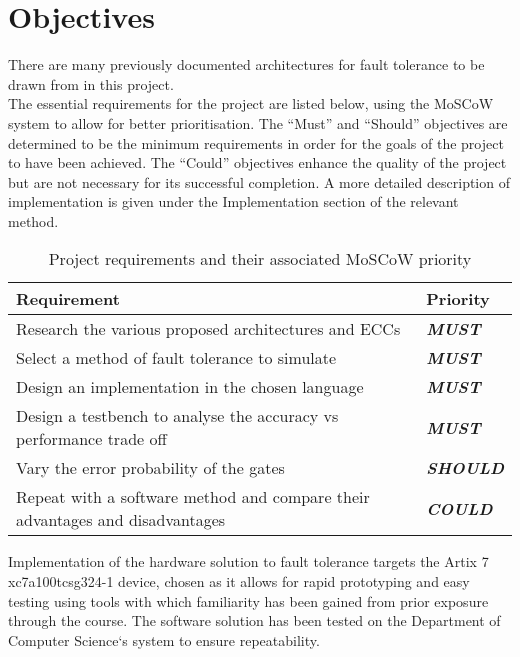 \section{Objectives}
\label{sec:objs}

\noindent There are many previously documented architectures for fault tolerance to be drawn from in this project. \\

\noindent The essential requirements for the project are listed below, using the MoSCoW system to allow for better prioritisation. The 
``Must'' and ``Should'' objectives are determined to be the minimum requirements in order for the goals of the project to have been 
achieved. The “Could” objectives enhance the quality of the project but are not necessary for its successful completion. A more detailed 
description of implementation is given under the Implementation section of the relevant method.

\begin{table}[H] 
\begin{tabular}{| M{0.47\textwidth} | M{0.47\textwidth} |}
    \hline
    Requirement & Priority  \\ \hline
    Research the various proposed architectures and ECCs & \textbf{\emph{{MUST}}} \\ \hline
    Select a method of fault tolerance to simulate & \textbf{\emph{{MUST}}} \\ \hline
    Design an implementation in the chosen language & \textbf{\emph{{MUST}}} \\ \hline
    Design a testbench to analyse the accuracy vs performance trade off & \textbf{\emph{{MUST}}} \\ \hline
    Vary the error probability of the gates & \textbf{\emph{{SHOULD}}} \\ \hline
    Repeat with a software method and compare their advantages and disadvantages & \textbf{\emph{{COULD}}} \\ \hline
\end{tabular}
\caption{Project requirements and their associated MoSCoW priority}
\label{table:reqs}
\end{table}

\noindent Implementation of the hardware solution to fault tolerance targets the Artix 7 xc7a100tcsg324-1 device, chosen as it allows for rapid 
prototyping and easy testing using tools with which familiarity has been gained from prior exposure through the course. The software 
solution has been tested on the Department of Computer Science`s system to ensure repeatability. 
